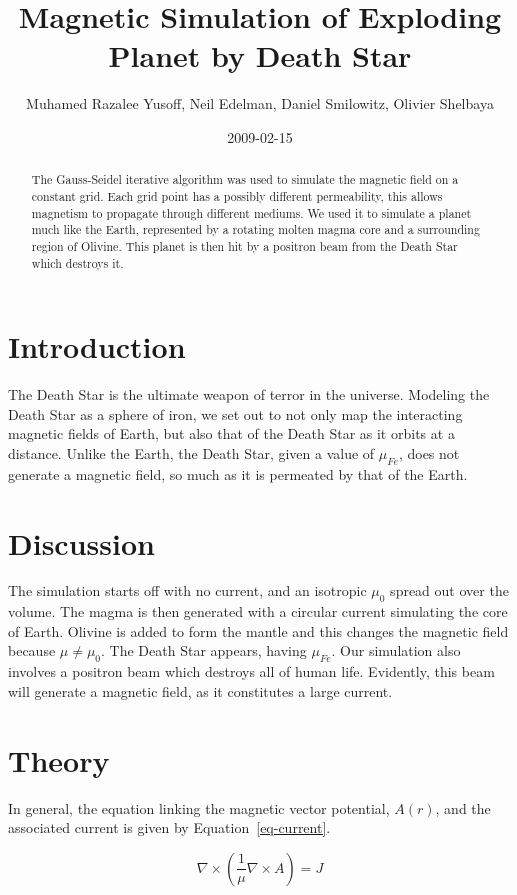 \documentclass[twocolumn]{article}
\author{Muhamed Razalee Yusoff, Neil Edelman, Daniel Smilowitz, Olivier Shelbaya}
\title{Magnetic Simulation of Exploding Planet by Death Star}
\date{2009-02-15}
\begin{document}
\maketitle

\begin{abstract}
The Gauss-Seidel iterative algorithm was used to simulate the magnetic
field on a constant grid. Each grid point has a possibly different
permeability, this allows magnetism to propagate through different
mediums. We used it to simulate a planet much like the Earth, represented
by a rotating molten magma core and a surrounding region of Olivine.
This planet is then hit by a positron beam from the Death Star which destroys it.
\end{abstract}

\section{Introduction}
The Death Star is the ultimate weapon of terror in the universe.
Modeling the Death Star as a sphere of iron, we set out to not only
map the interacting magnetic fields of Earth, but also that of the
Death Star as it orbits at a distance. Unlike the Earth, the Death
Star, given a value of $\mu_{Fe}$, does not generate a magnetic field,
so much as it is permeated by that of the Earth.

\section{Discussion}

The simulation starts off with no current, and an isotropic $\mu_{0}$
spread out over the volume. The magma is then generated with a circular
current simulating the core of Earth. Olivine is added to form the mantle
and this changes the magnetic field because $\mu \ne \mu_{0}$. The Death
Star appears, having $\mu_{Fe}$. Our simulation also involves a positron
beam which destroys all of human life. Evidently, this beam will generate
a magnetic field, as it constitutes a large current.

\section{Theory}

In general, the equation linking the magnetic vector potential,
$A(r)$, and the associated current is given by
Equation~\ref{eq-current}\cite{griffiths}.

\begin{equation}
\nabla \times (\frac{1}{\mu} \nabla \times A) = J
\label{eq-current}
\end{equation}
\end{document}
